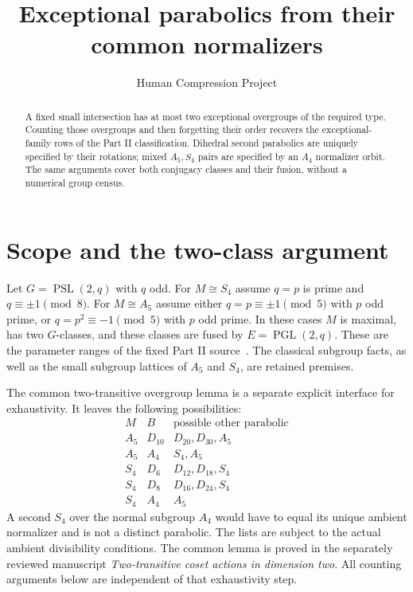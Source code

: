 \documentclass[11pt]{article}
\title{Exceptional parabolics from their common normalizers}
\author{Human Compression Project}\date{}
\newcommand{\PSL}{\operatorname{PSL}}\newcommand{\PGL}{\operatorname{PGL}}\newcommand{\N}{\operatorname{N}}
\begin{document}
\maketitle
\begin{abstract}
A fixed small intersection has at most two exceptional overgroups
of the required type. Counting those overgroups and then forgetting
their order recovers the exceptional-family rows of the Part II
classification. Dihedral second parabolics are uniquely specified by
their rotations; mixed $A_5,S_4$ pairs are specified by an $A_4$
normalizer orbit. The same arguments cover both conjugacy classes
and their fusion, without a numerical group census.
\end{abstract}

\section{Scope and the two-class argument}
Let $G=\PSL(2,q)$ with $q$ odd. For $M\cong S_4$ assume
$q=p$ is prime and $q\equiv\pm1\pmod8$. For $M\cong A_5$
assume either $q=p\equiv\pm1\pmod5$ with $p$ odd prime,
or $q=p^2\equiv-1\pmod5$ with $p$ odd prime. In these cases
$M$ is maximal, has two $G$-classes, and these classes are fused
by $E=\PGL(2,q)$. These are the parameter ranges of the fixed Part II source~\cite{source}.
The classical subgroup facts, as well as the
small subgroup lattices of $A_5$ and $S_4$, are retained premises.

The common two-transitive overgroup lemma is a separate explicit
interface for exhaustivity. It leaves the following possibilities:
\[
\begin{array}{c|c|l}
M&B&\text{possible other parabolic}\\\hline
A_5&D_{10}&D_{20},D_{30},A_5\\
A_5&A_4&S_4,A_5\\
S_4&D_6&D_{12},D_{18},S_4\\
S_4&D_8&D_{16},D_{24},S_4\\
S_4&A_4&A_5
\end{array}
\]
A second $S_4$ over the normal subgroup $A_4$ would have to equal
its unique ambient normalizer and is not a distinct parabolic. The
lists are subject to the actual ambient divisibility conditions. The
common lemma is proved in the separately reviewed manuscript
\emph{Two-transitive coset actions in dimension two}.
All counting arguments below are independent of that exhaustivity step.
\end{document}
